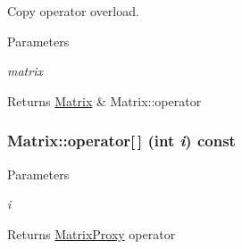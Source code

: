 Copy operator overload. 


\begin{DoxyParams}{Parameters}
\item[{\em matrix}]\end{DoxyParams}
\begin{DoxyReturn}{Returns}
\hyperlink{classMatrix}{Matrix} \& Matrix::operator 
\end{DoxyReturn}
\hypertarget{classMatrix_ab54bf109f85ced0472a7e0c03d16471c}{
\subsubsection[{operator[]}]{ Matrix::operator\mbox{[}$\,$\mbox{]} (int {\em i}) const}}
\label{classMatrix_ab54bf109f85ced0472a7e0c03d16471c}

\begin{DoxyParams}{Parameters}
\item[{\em i}]\end{DoxyParams}
\begin{DoxyReturn}{Returns}
\hyperlink{classMatrix_1_1MatrixProxy}{MatrixProxy} operator 
\end{DoxyReturn}


